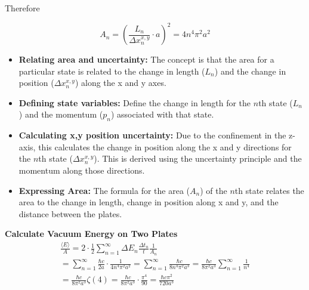     Therefore

    \[A_n = (\frac{L_n}{\Delta x_n^{x,y}} \cdot a)^2 = 4 n^4 \pi^2 a^2\]
\begin{itemize}
    \item \textbf{Relating area and uncertainty:} The concept is that the area for a particular state is related to 
    the change in length ($L_n$) and the change in position ($\Delta x_n^{x,y}$) along the x and y axes.
    \item \textbf{Defining state variables:} Define the change in length for the $n$th state ($L_n$) 
    and the momentum ($p_n$) associated with that state.
    \item \textbf{Calculating x,y position uncertainty:} Due to the confinement in the z-axis, 
    this calculates the change in position along the x and y directions for the $n$th state ($\Delta x_n^{x,y}$). 
    This is derived using the uncertainty principle and the momentum along those directions.
    \item \textbf{Expressing Area:} The formula for the area ($A_n$) of the $n$th state relates the area to the change in length, 
    change in position along x and y, and the distance between the plates.
    \end{itemize}
\noindent\textbf{Calculate Vacuum Energy on Two Plates}
\begin{align*}
    &\frac{\langle E \rangle}{A} = 2 \cdot \frac{1}{2}\sum_{n=1}^{\infty}\Delta E_n\frac{\Delta t_n}{t}\frac{1}{A_n}& \\
    &= \sum_{n=1}^{\infty} \frac{\hbar c }{2 a} \cdot \frac{1}{4 n^4 \pi^2 a^2} = \sum_{n=1}^{\infty} \frac{\hbar c}{8 n^4 \pi^2 a^3} = \frac{\hbar c}{8 \pi^2 a^3} \sum_{n=1}^{\infty} \frac{1}{n^4}&\\
    &= \frac{\hbar c}{8 \pi^2 a^3} \zeta(4) = \frac{\hbar c}{8 \pi^2 a^3} \cdot \frac{\pi^4}{90} = \frac{\hbar c \pi^2}{720 a^3}&
\end{align*}